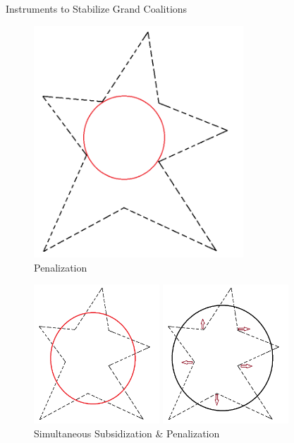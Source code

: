 \documentclass[14pt]{beamer}
\begin{document}
\begin{frame}{Instruments to Stabilize Grand Coalitions}
\begin{figure}[H]
\begin{minipage}[t]{0.32\textwidth}
\end{minipage}
\begin{minipage}[t]{0.32\textwidth}
\centering
\includegraphics[width=0.7\textwidth]{conculsion2.png}
\caption*{Penalization}
\end{minipage}
\end{figure}
\begin{figure}[H]
\centering
\begin{minipage}[t]{0.49\textwidth}
\centering
\includegraphics[width=0.42\textwidth]{conculsion4.png}
\caption*{Simultaneous Subsidization \& Penalization}
\end{minipage}
\begin{minipage}[t]{0.49\textwidth}
\centering
\includegraphics[width=0.42\textwidth]{conculsion5.png}

\end{minipage}
\end{figure}
\end{frame}
\end{document}
